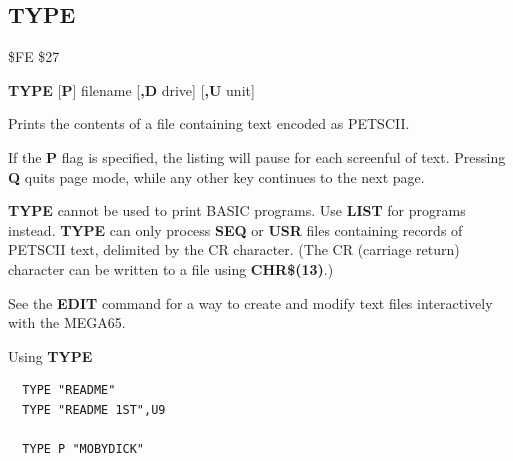 \subsection{TYPE}
\begin{description}[leftmargin=2cm,style=nextline]
\item [Token:] \$FE \$27
\item [Format:] {\bf TYPE} [{\bf P}] filename [{\bf,D} drive] [{\bf,U} unit]
\item [Usage:] Prints the contents of a file containing
               text encoded as PETSCII.

   If the {\bf P} flag is specified, the listing will pause for each screenful
   of text. Pressing {\bf Q} quits page mode, while any other key continues to
   the next page.

   \filenamedefinition

   \drivedefinition

   \unitdefinition

\item [Remarks:] {\bf TYPE} cannot be used to print
                 BASIC programs. Use {\bf LIST} for programs instead.
                 {\bf TYPE} can only process {\bf SEQ} or {\bf USR} files
                 containing records of PETSCII text, delimited
                 by the CR character.
                 (The CR (carriage return) character can
                 be written to a file using {\bf CHR\$(13)}.)

                 See the {\bf EDIT} command for a way to create and modify
                 text files interactively with the MEGA65.

\item [Example:] Using {\bf TYPE}
\begin{tcolorbox}[colback=black,coltext=white]
\verbatimfont{\codefont}
\begin{verbatim}
  TYPE "README"
  TYPE "README 1ST",U9

  TYPE P "MOBYDICK"
\end{verbatim}
\end{tcolorbox}
\end{description}


\newpage
